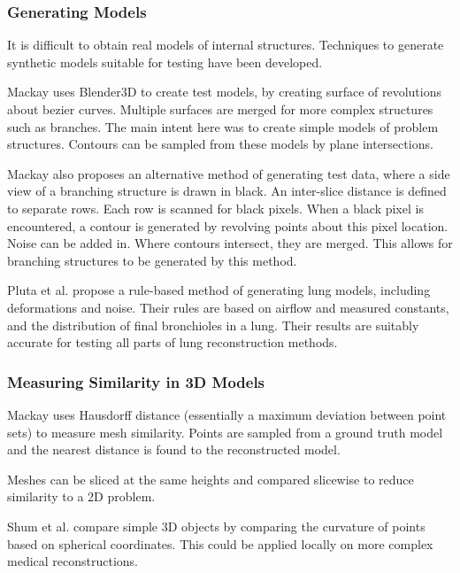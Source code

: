 \documentclass[11p, titlepage]{article}
\begin{document}
\subsubsection{Generating Models}

It is difficult to obtain real models of internal structures. Techniques to generate synthetic models suitable for testing have been developed.

Mackay \cite{mackay2019robust} uses Blender3D to create test models, by creating surface of revolutions about bezier curves. Multiple surfaces are merged for more complex structures such as branches. The main intent here was to create simple models of problem structures. Contours can be sampled from these models by plane intersections.

Mackay \cite{mackay2019robust} also proposes an alternative method of generating test data, where a side view of a branching structure is drawn in black. An inter-slice distance is defined to separate rows. Each row is scanned for black pixels. When a black pixel is encountered, a contour is generated by revolving points about this pixel location. Noise can be added in. Where contours intersect, they are merged. This allows for branching structures to be generated by this method.

Pluta et al. \cite{pluta2012new} propose a rule-based method of generating lung models, including deformations and noise. Their rules are based on airflow and measured constants, and the distribution of final bronchioles in a lung. Their results are suitably accurate for testing all parts of lung reconstruction methods.

\subsubsection{Measuring Similarity in 3D Models}

Mackay \cite{mackay2019robust} uses Hausdorff distance (essentially a maximum deviation between point sets) to measure mesh similarity. Points are sampled from a ground truth model and the nearest distance is found to the reconstructed model.

Meshes can be sliced at the same heights and compared slicewise to reduce similarity to a 2D problem.

Shum et al. \cite{shum19963d} compare simple 3D objects by comparing the curvature of points based on spherical coordinates. This could be applied locally on more complex medical reconstructions.
\end{document}
